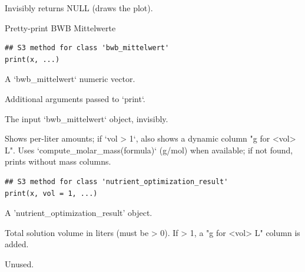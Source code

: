 \documentclass[a4paper]{book}
\begin{document}
%
\begin{Value}
Invisibly returns NULL (draws the plot).
\end{Value}
%
\begin{Description}
Pretty-print BWB Mittelwerte
\end{Description}
%
\begin{Usage}
\begin{verbatim}
## S3 method for class 'bwb_mittelwert'
print(x, ...)
\end{verbatim}
\end{Usage}
%
\begin{Arguments}
\begin{ldescription}
\item[\code{x}] A `bwb\_mittelwert` numeric vector.

\item[\code{...}] Additional arguments passed to `print`.
\end{ldescription}
\end{Arguments}
%
\begin{Value}
The input `bwb\_mittelwert` object, invisibly.
\end{Value}
%
\begin{Description}
Shows per-liter amounts; if `vol > 1`, also shows a dynamic column "g for <vol> L".
Uses `compute\_molar\_mass(formula)` (g/mol) when available; if not found, prints without mass columns.
\end{Description}
%
\begin{Usage}
\begin{verbatim}
## S3 method for class 'nutrient_optimization_result'
print(x, vol = 1, ...)
\end{verbatim}
\end{Usage}
%
\begin{Arguments}
\begin{ldescription}
\item[\code{x}] A 'nutrient\_optimization\_result' object.

\item[\code{vol}] Total solution volume in liters (must be > 0). If > 1, a "g for <vol> L" column is added.

\item[\code{...}] Unused.
\end{ldescription}
\end{Arguments}
\end{document}
